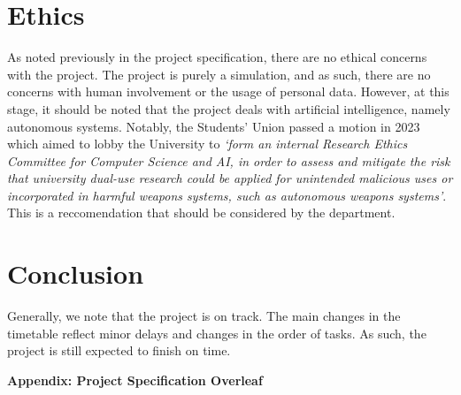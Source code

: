 \documentclass{article}
\begin{document}
\section{Ethics}
As noted previously in the project specification, there are no ethical concerns with the project. The project is purely a simulation, and as such, there are no concerns with human involvement or the usage of personal data. However, at this stage, it should be noted that the project deals with artificial intelligence, namely autonomous systems. Notably, the Students' Union passed a motion in 2023 which aimed to lobby the University to \emph{`form an internal Research Ethics Committee for Computer Science and AI, in order to assess and mitigate the risk that university dual-use research could be applied for unintended malicious uses or incorporated in harmful weapons systems, such as autonomous weapons systems'}\cite{WSU}. This is a reccomendation that should be considered by the department.

\section{Conclusion}

Generally, we note that the project is on track. The main changes in the timetable reflect minor delays and changes in the order of tasks. As such, the project is still expected to finish on time.

\newpage




\LARGE
\bigskip
\centering
\textbf{Appendix: Project Specification Overleaf}


\end{document}
